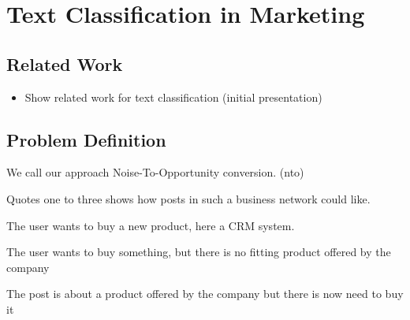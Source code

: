 
\section{Text Classification in Marketing}
\label{sec:background}

\subsection{Related Work}

\begin{itemize}
	\item Show related work for text classification (initial presentation)
\end{itemize}

\subsection{Problem Definition}
\label{sec:background-problem}

We call our approach Noise-To-Opportunity conversion. (nto)

Quotes one to three shows how posts in such a business network could like. 

\begin{post}
	\centering
	\caption{The user wants to buy a new product, here a CRM system.}
	\label{post:demand-and-product}
\end{post}

\begin{post}
	\centering
	\caption{The user wants to buy something, but there is no fitting product offered by the company}
	\label{post:demand-only}
\end{post}

\begin{post}
	\centering
	\caption{The post is about a product offered by the company but there is now need to buy it}
	\label{post:product-only}
\end{post}


